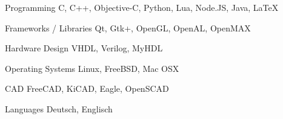 

\begin{cvskills}

  \cvskill
    {Programming} %
    {C, C++, Objective-C, Python, Lua, Node.JS, Java, LaTeX} %
    
  \cvskill
    {Frameworks / Libraries} %
    {Qt, Gtk+, OpenGL, OpenAL, OpenMAX} %

  \cvskill
    {Hardware Design} %
    {VHDL, Verilog, MyHDL} %
    
  \cvskill
    {Operating Systems} %
    {Linux, FreeBSD, Mac OSX} %
    
  \cvskill
    {CAD} %
    {FreeCAD, KiCAD, Eagle, OpenSCAD} %

  \cvskill
    {Languages} %
    {Deutsch, Englisch} %

\end{cvskills}
